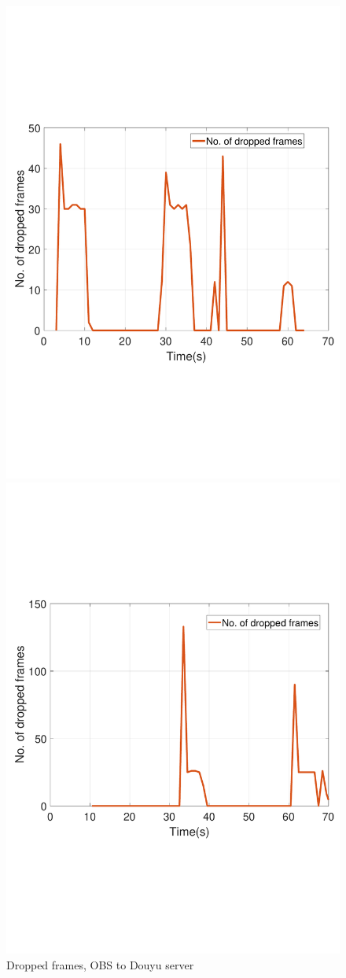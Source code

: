 \begin{figure}[htb]
  \includegraphics[width=0.8\linewidth]{fig/obs_douyu_drop.pdf}
  \caption{Dropped frames, OBS to Douyu server}
  \label{fig:obs-douyu-drop}
\endminipage\hfill
{}
  \includegraphics[width=0.8\linewidth]{fig/douyu_drop.pdf}

\end{figure}
